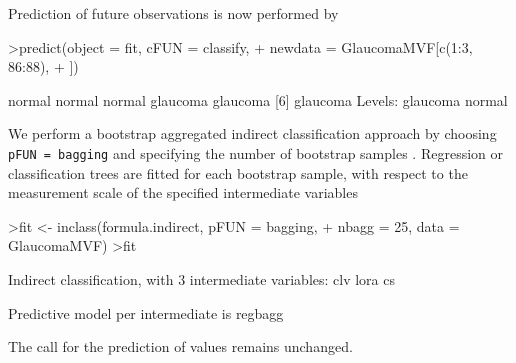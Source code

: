 \documentclass[11pt]{article}
\begin{document}
Prediction of future observations is now performed by
\begin{Schunk}
\begin{Sinput}
>predict(object = fit, cFUN = classify, 
+     newdata = GlaucomaMVF[c(1:3, 86:88), 
+         ])
\end{Sinput}
\begin{Soutput}
[1] normal   normal   normal   glaucoma glaucoma
[6] glaucoma
Levels: glaucoma normal
\end{Soutput}
\end{Schunk}
We perform a bootstrap aggregated indirect classification approach by 
choosing \texttt{pFUN = bagging} and specifying the number of 
bootstrap samples \citep{ifcs:2001}. Regression or classification 
trees are fitted for each bootstrap sample, with respect to the 
measurement scale of the specified intermediate variables 
\begin{Schunk}
\begin{Sinput}
>fit <- inclass(formula.indirect, pFUN = bagging, 
+     nbagg = 25, data = GlaucomaMVF)
>fit
\end{Sinput}
\begin{Soutput}
 Indirect classification, with 3 intermediate variables: 
 clv lora cs 
 
 Predictive model per intermediate is regbagg 
\end{Soutput}
\end{Schunk}
The call for the prediction of values remains unchanged.
\end{document}
